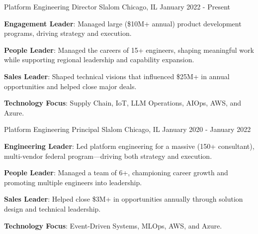 

\begin{cventries}

  \cventry
    {Platform Engineering Director} %
    {Slalom} %
    {Chicago, IL} %
    {January 2022 - Present} %
    {
      \begin{cvitems} %
        \item {\textbf{Engagement Leader}: Managed large (\$10M+ annual) product development programs, driving strategy and execution.}
        \item {\textbf{People Leader}: Managed the careers of 15+ engineers, shaping meaningful work while supporting regional leadership and capability expansion.}
        \item {\textbf{Sales Leader}: Shaped technical visions that influenced \$25M+ in annual opportunities and helped close major deals.}
        \item {\textbf{Technology Focus}: Supply Chain, IoT, LLM Operations, AIOps, AWS, and Azure.}
      \end{cvitems}
    }

  \cventry
    {Platform Engineering Principal} %
    {Slalom} %
    {Chicago, IL} %
    {January 2020 - January 2022} %
    {
      \begin{cvitems} %
        \item {\textbf{Engineering Leader}: Led platform engineering for a massive (150+ consultant), multi-vendor federal program—driving both strategy and execution.}
        \item {\textbf{People Leader}: Managed a team of 6+, championing career growth and promoting multiple engineers into leadership.}
        \item {\textbf{Sales Leader}: Helped close \$3M+ in opportunities annually through solution design and technical leadership.}
        \item {\textbf{Technology Focus}: Event-Driven Systems, MLOps, AWS, and Azure.}
      \end{cvitems}
    }


\end{cventries}
